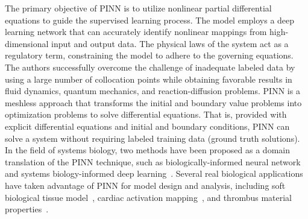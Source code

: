 The primary objective of PINN is to utilize nonlinear partial differential equations to guide the supervised learning process. The model employs a deep learning network that can accurately identify nonlinear mappings from high-dimensional input and output data. The physical laws of the system act as a regulatory term, constraining the model to adhere to the governing equations. The authors successfully overcome the challenge of inadequate labeled data by using a large number of collocation points while obtaining favorable results in fluid dynamics, quantum mechanics, and reaction-diffusion problems. PINN is a meshless approach that transforms the initial and boundary value problems into optimization problems to solve differential equations.
That is, provided with explicit differential equations and initial and boundary conditions, PINN can solve a system without requiring labeled training data (ground truth solutions).
In the field of systems biology, two methods have been proposed as a domain translation of the PINN technique, such as 
biologically-informed neural network~\cite{lagergren2020biologically,greene2020biologically} and systems biology-informed deep learning~\cite{yazdani2020systems}.
Several real biological applications have taken advantage of PINN for model design and analysis, including soft biological tissue model~\cite{liu2020generic}, cardiac activation mapping~\cite{sahli2020physics}, and thrombus material properties~\cite{yin2021non}.


